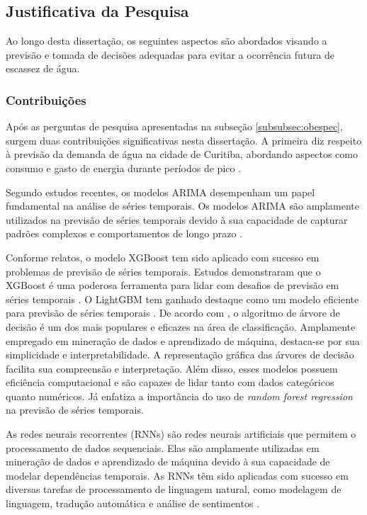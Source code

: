 \subsection{Justificativa da Pesquisa} \label{subsec:justif}

Ao longo desta dissertação, os seguintes aspectos são abordados visando a previsão e tomada de decisões adequadas para evitar a ocorrência futura de escassez de água.

\subsubsection{Contribui\c c\~oes} \label{subsubsec:Contribuição}

Após as perguntas de pesquisa apresentadas na subseção \ref{subsubsec:obespec}, surgem duas contribuições significativas nesta dissertação. A primeira diz respeito à previsão da demanda de água na cidade de Curitiba, abordando aspectos como consumo e gasto de energia durante períodos de pico .

Segundo estudos recentes, os modelos ARIMA desempenham um papel fundamental na análise de séries temporais. Os modelos ARIMA são amplamente utilizados na previsão de séries temporais devido à sua capacidade de capturar padrões complexos e comportamentos de longo prazo \cite{arima_python}.

Conforme relatos, o modelo XGBoost tem sido aplicado com sucesso em problemas de previsão de séries temporais. Estudos demonstraram que o XGBoost é uma poderosa ferramenta para lidar com desafios de previsão em séries temporais \cite{xgboost_intro}. O LightGBM tem ganhado destaque como um modelo eficiente para previsão de séries temporais \cite{lightgbm_forecasting}. De acordo com , o algoritmo de árvore de decisão é um dos mais populares e eficazes na área de classificação. Amplamente empregado em mineração de dados e aprendizado de máquina, destaca-se por sua simplicidade e interpretabilidade. A representação gráfica das árvores de decisão facilita sua compreensão e interpretação. Além disso, esses modelos possuem eficiência computacional e são capazes de lidar tanto com dados categóricos quanto numéricos. Já  enfatiza a importância do uso de \textit{random forest regression} na previsão de séries temporais.

As redes neurais recorrentes (RNNs) são redes neurais artificiais que permitem o processamento de dados sequenciais. Elas são amplamente utilizadas em mineração de dados e aprendizado de máquina devido à sua capacidade de modelar dependências temporais. As RNNs têm sido aplicadas com sucesso em diversas tarefas de processamento de linguagem natural, como modelagem de linguagem, tradução automática e análise de sentimentos \cite{rnn}.
		
